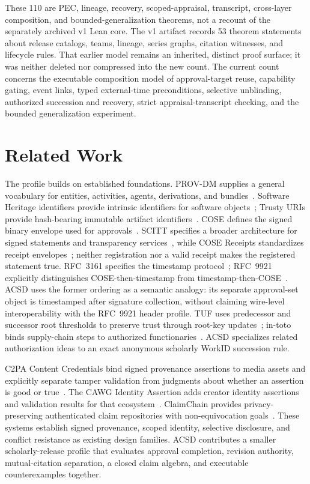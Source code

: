 \documentclass[conference,compsoc]{IEEEtran}
\begin{document}
These 110 are PEC, lineage, recovery, scoped-appraisal, transcript,
cross-layer composition, and bounded-generalization theorems, not a recount
of the separately archived v1 Lean core.
The v1 artifact records 53 theorem statements
about release catalogs, teams, lineage, series graphs, citation witnesses, and
lifecycle rules. That earlier model remains an inherited, distinct proof
surface; it was neither deleted nor compressed into the new count. The current
count concerns the executable composition model of approval-target reuse,
capability gating, event links, typed external-time preconditions, selective
unblinding, authorized succession and recovery, strict appraisal-transcript
checking, and the bounded generalization experiment.

\section{Related Work}

The profile builds on established foundations. PROV-DM supplies a general vocabulary for entities, activities, agents, derivations, and bundles~\cite{prov}. Software Heritage identifiers provide intrinsic identifiers for software objects~\cite{swhid}; Trusty URIs provide hash-bearing immutable artifact identifiers~\cite{trusty}. COSE defines the signed binary envelope used for approvals~\cite{cose}. SCITT specifies a broader architecture for signed statements and transparency services~\cite{scitt}, while COSE Receipts standardizes receipt envelopes~\cite{cosereceipts}; neither registration nor a valid receipt makes the registered statement true. RFC~3161 specifies the timestamp protocol~\cite{rfc3161}; RFC~9921 explicitly distinguishes COSE-then-timestamp from timestamp-then-COSE~\cite{rfc9921}. ACSD uses the former ordering as a semantic analogy: its separate approval-set object is timestamped after signature collection, without claiming wire-level interoperability with the RFC~9921 header profile. TUF uses predecessor and successor root thresholds to preserve trust through root-key updates~\cite{tufspec}; in-toto binds supply-chain steps to authorized functionaries~\cite{intoto}. ACSD specializes related authorization ideas to an exact anonymous scholarly WorkID succession rule.

C2PA Content Credentials bind signed provenance assertions to media assets and
explicitly separate tamper validation from judgments about whether an assertion
is good or true~\cite{c2pa}. The CAWG Identity Assertion adds creator identity
assertions and validation results for that ecosystem~\cite{cawg}. ClaimChain
provides privacy-preserving authenticated claim repositories with
non-equivocation goals~\cite{claimchain}. These systems establish signed
provenance, scoped identity, selective disclosure, and conflict resistance as
existing design families. ACSD contributes a smaller scholarly-release profile
that evaluates approval completion, revision authority, mutual-citation
separation, a closed claim algebra, and executable counterexamples together.
\end{document}
